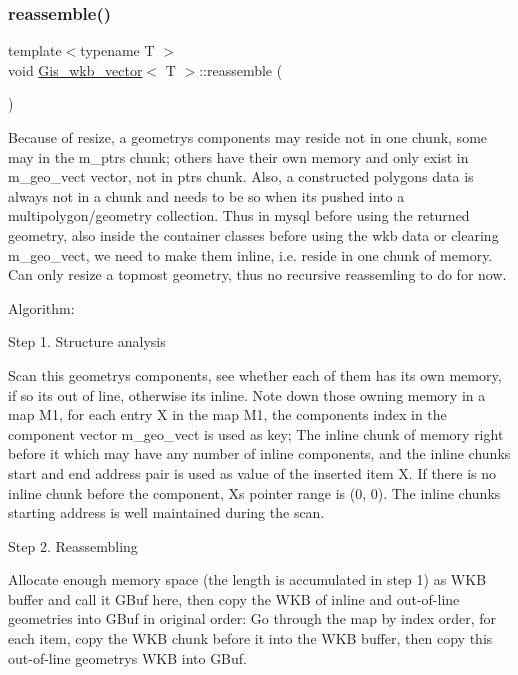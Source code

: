\subsubsection{\texorpdfstring{reassemble()}{reassemble()}}
{\footnotesize\ttfamily template$<$typename T $>$ \\
void \mbox{\hyperlink{classGis__wkb__vector}{Gis\+\_\+wkb\+\_\+vector}}$<$ T $>$\+::reassemble (\begin{DoxyParamCaption}{ }\end{DoxyParamCaption})}

Because of resize, a geometry\textquotesingle{}s components may reside not in one chunk, some may in the m\+\_\+ptr\textquotesingle{}s chunk; others have their own memory and only exist in m\+\_\+geo\+\_\+vect vector, not in ptr\textquotesingle{}s chunk. Also, a constructed polygon\textquotesingle{}s data is always not in a chunk and needs to be so when it\textquotesingle{}s pushed into a multipolygon/geometry collection. Thus in mysql before using the returned geometry, also inside the container classes before using the wkb data or clearing m\+\_\+geo\+\_\+vect, we need to make them inline, i.\+e. reside in one chunk of memory. Can only resize a topmost geometry, thus no recursive reassemling to do for now.

Algorithm\+:

Step 1. Structure analysis

Scan this geometry\textquotesingle{}s components, see whether each of them has its own memory, if so it\textquotesingle{}s \textquotesingle{}out of line\textquotesingle{}, otherwise it\textquotesingle{}s \textquotesingle{}inline\textquotesingle{}. Note down those owning memory in a map M1, for each entry X in the map M1, the component\textquotesingle{}s index in the component vector m\+\_\+geo\+\_\+vect is used as key; The inline chunk of memory right before it which may have any number of inline components, and the inline chunk\textquotesingle{}s start and end address pair is used as value of the inserted item X. If there is no inline chunk before the component, X\textquotesingle{}s pointer range is (0, 0). The inline chunk\textquotesingle{}s starting address is well maintained during the scan.

Step 2. Reassembling

Allocate enough memory space (the length is accumulated in step 1) as W\+KB buffer and call it G\+Buf here, then copy the W\+KB of inline and out-\/of-\/line geometries into G\+Buf in original order\+: Go through the map by index order, for each item, copy the W\+KB chunk before it into the W\+KB buffer, then copy this out-\/of-\/line geometry\textquotesingle{}s W\+KB into G\+Buf.

